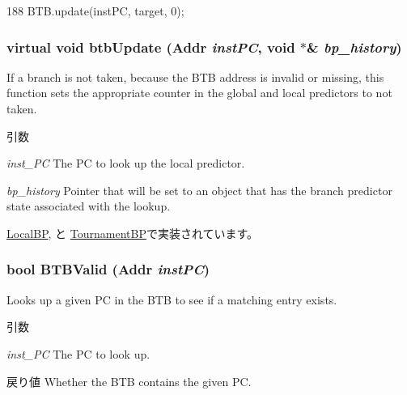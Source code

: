 \begin{DoxyCode}
188     { BTB.update(instPC, target, 0); }
\end{DoxyCode}
\hypertarget{classBPredUnit_a7b687ebde63095b00a0b083ba6607cd4}{
\subsubsection[{btbUpdate}]{\setlength{\rightskip}{0pt plus 5cm}virtual void btbUpdate ({\bf Addr} {\em instPC}, \/  void $\ast$\& {\em bp\_\-history})}}
\label{classBPredUnit_a7b687ebde63095b00a0b083ba6607cd4}
If a branch is not taken, because the BTB address is invalid or missing, this function sets the appropriate counter in the global and local predictors to not taken. 
\begin{DoxyParams}{引数}
\item[{\em inst\_\-PC}]The PC to look up the local predictor. \item[{\em bp\_\-history}]Pointer that will be set to an object that has the branch predictor state associated with the lookup. \end{DoxyParams}


\hyperlink{classLocalBP_a101ada238eecd07cc6905c60272e2693}{LocalBP}, と \hyperlink{classTournamentBP_a101ada238eecd07cc6905c60272e2693}{TournamentBP}で実装されています。\hypertarget{classBPredUnit_a93ec70ede183b1d9c34cef98153c01f8}{
\subsubsection[{BTBValid}]{\setlength{\rightskip}{0pt plus 5cm}bool BTBValid ({\bf Addr} {\em instPC})}}
\label{classBPredUnit_a93ec70ede183b1d9c34cef98153c01f8}
Looks up a given PC in the BTB to see if a matching entry exists. 
\begin{DoxyParams}{引数}
\item[{\em inst\_\-PC}]The PC to look up. \end{DoxyParams}
\begin{DoxyReturn}{戻り値}
Whether the BTB contains the given PC. 
\end{DoxyReturn}



